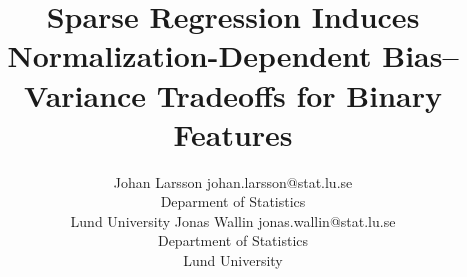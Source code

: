 \documentclass[10pt]{article} %
\title{Sparse Regression Induces Normalization-Dependent Bias--Variance Tradeoffs for Binary Features}
\author{%
  \name Johan Larsson \email johan.larsson@stat.lu.se\\
  \addr Deparment of Statistics\\Lund University
  \AND
  \name Jonas Wallin \email jonas.wallin@stat.lu.se\\
  \addr Department of Statistics\\Lund University
}
\begin{document}
\maketitle

\begin{abstract}
  
\end{abstract}






%

%




\appendix



\end{document}
